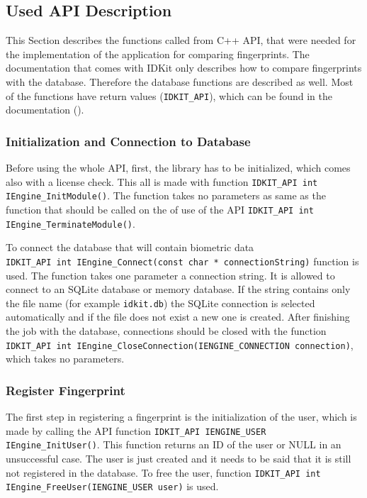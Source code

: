 \subsection{Used API Description}
\label{API}
This Section describes the functions called from C++ API, that were needed for the implementation of the application for comparing fingerprints. The documentation that comes with IDKit only describes how to compare fingerprints with the database. Therefore the database functions are described as well. Most of the functions have return values (\texttt{IDKIT\_API}), which can be found in the documentation (\cite{idkitsdk}).

\subsubsection{Initialization and Connection to Database}
Before using the whole API, first, the library has to be initialized, which comes also with a license check. This all is made with function \texttt{IDKIT\_API int IEngine\_InitModule()}. The function takes no parameters as same as the function that should be called on the of use of the API \texttt{IDKIT\_API int IEngine\_TerminateModule()}. 

To connect the database that will contain biometric data \\ \texttt{IDKIT\_API int IEngine\_Connect(const char * connectionString)} function is used. The function takes one parameter a connection string. It is allowed to connect to an SQLite database or memory database. If the string contains only the file name (for example \texttt{idkit.db}) the SQLite connection is selected automatically and if the file does not exist a new one is created. After finishing the job with the database, connections should be closed with the function \texttt{IDKIT\_API int IEngine\_CloseConnection(IENGINE\_CONNECTION con\-nection)}, which takes no parameters.

\subsubsection{Register Fingerprint}
The first step in registering a fingerprint is the initialization of the user, which is made by calling the API function \texttt{IDKIT\_API IENGINE\_USER IEngine\_InitUser()}. This function returns an ID of the user or NULL in an unsuccessful case. The user is just created and it needs to be said that it is still not registered in the database. To free the user, function \texttt{IDKIT\_API int IEngine\_FreeUser(IENGINE\_USER user)} is used.

